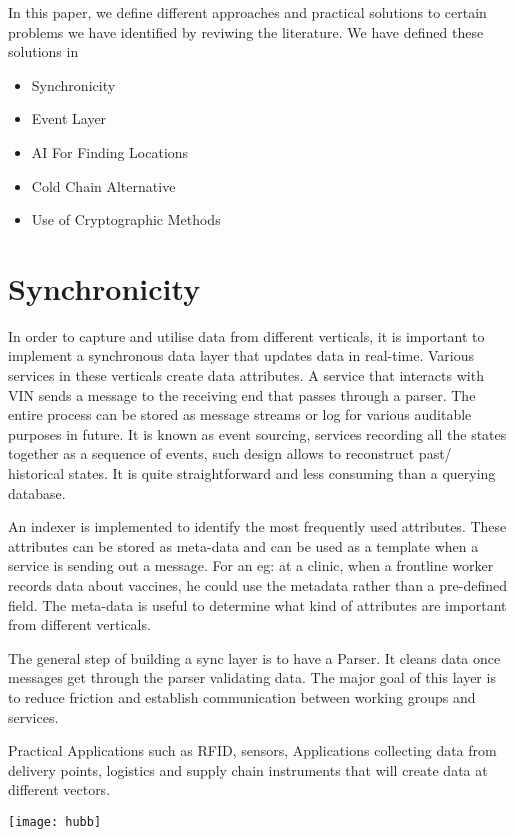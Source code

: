 \documentclass{article}
\begin{document}
In this paper, we define different approaches and practical solutions to certain problems we have identified by reviwing the literature. We have defined these solutions in 

\begin{itemize}
	\item Synchronicity
	\item Event Layer
	\item AI For Finding Locations
	\item Cold Chain Alternative
	\item Use of Cryptographic Methods
\end{itemize}




\section{Synchronicity}
In order to capture and utilise data from different verticals, it is important to implement a synchronous data layer that updates data in real-time. Various services in these verticals create data attributes. A service that interacts with VIN sends a message to the receiving end that passes through a parser. The entire process can be stored as message streams or log for various auditable purposes in future. It is known as event sourcing, services recording all the states together as a sequence of events, such design allows to reconstruct past/ historical states. It is quite straightforward and less consuming than a querying database.

An indexer is implemented to identify the most frequently used attributes. These attributes can be stored as meta-data and can be used as a template when a service is sending out a message. For an eg: at a clinic, when a frontline worker records data about vaccines, he could use the metadata rather than a pre-defined field. The meta-data is useful to determine what kind of attributes are important from different verticals.

The general step of building a sync layer is to have a Parser. It cleans data once messages get through the parser validating data. The major goal of this layer is to reduce friction and establish communication between working groups and services.

Practical Applications such as RFID, sensors, Applications collecting data from delivery points, logistics and supply chain instruments that will create data at different vectors.

\texttt{[image: hubb]}
\end{document}
